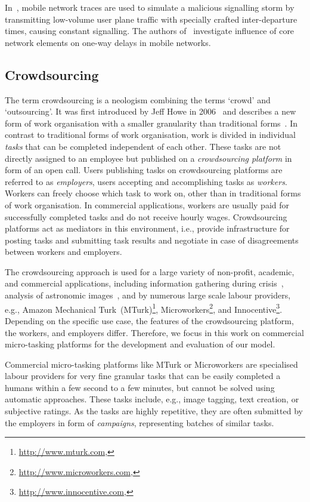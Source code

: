 In~\cite{Lee2007}, mobile network traces are used to simulate a malicious signalling storm by transmitting low-volume user plane traffic with specially crafted inter-departure times, causing constant signalling.
The authors of~\cite{Romirer-Maierhofer2008} investigate influence of core network elements on one-way delays in mobile networks.

\subsection{Crowdsourcing}
The term crowdsourcing is a neologism combining the terms `crowd' and `outsourcing'.
It was first introduced by Jeff Howe in 2006~\cite{Howe2006} and describes a new form of work organisation with a smaller granularity than traditional forms~\cite{Hossfeld2011c}.
In contrast to traditional forms of work organisation, work is divided in individual \emph{tasks} that can be completed independent of each other. 
These tasks are not directly assigned to an employee but published on a \emph{crowdsourcing platform} in form of an open call.
Users publishing tasks on crowdsourcing platforms are referred to as \emph{employers}, users accepting and accomplishing tasks as \emph{workers}.
Workers can freely choose which task to work on, other than in traditional forms of work organisation.
In commercial applications, workers are usually paid for successfully completed tasks and do not receive hourly wages.
Crowdsourcing platforms act as mediators in this environment, i.e., provide infrastructure for posting tasks and submitting task results and negotiate in case of disagreements between workers and employers.

The crowdsourcing approach is used for a large variety of non-profit, academic, and commercial applications, including information gathering during crisis~\cite{Morrow2011}, analysis of astronomic images~\cite{Raddick2010}, and by numerous large scale labour providers, e.g., Amazon Mechanical Turk~(MTurk)\footnote{\url{http://www.mturk.com}, \accessed}, Microworkers\footnote{\url{http://www.microworkers.com}, \accessed}, and Innocentive\footnote{\url{http://www.innocentive.com}, \accessed}.
Depending on the specific use case, the features of the crowdsourcing platform, the workers, and employers differ.
Therefore, we focus in this work on commercial micro-tasking platforms for the development and evaluation of our model.

Commercial micro-tasking platforms like MTurk or Microworkers are specialised labour providers for very fine granular tasks that can be easily completed a humans within a few second to a few minutes, but cannot be solved using automatic approaches. 
These tasks include, e.g., image tagging, text creation, or subjective ratings.
As the tasks are highly repetitive, they are often submitted by the employers in form of \emph{campaigns}, representing batches of similar tasks.

